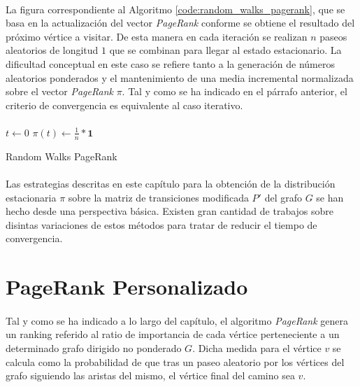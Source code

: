 \documentclass{subfiles}
\begin{document}
        \paragraph{}
        La figura correspondiente al Algoritmo \ref{code:random_walks_pagerank}, que se basa en la actualización del vector \emph{PageRank} conforme se obtiene el resultado del próximo vértice a visitar. De esta manera en cada iteración se realizan $n$ paseos aleatorios de longitud $1$ que se combinan para llegar al estado estacionario. La dificultad conceptual en este caso se refiere tanto a la generación de números aleatorios ponderados y el mantenimiento de una media incremental normalizada sobre el vector \emph{PageRank} $\pi$. Tal y como se ha indicado en el párrafo anterior, el criterio de convergencia es equivalente al caso iterativo.

        \paragraph{}
        \begin{algorithm}
          \SetAlgoLined
          $t \gets 0$\;
          $\pi(t) \gets \frac{1}{n}*\boldsymbol{1}$\;
          \caption{Random Walks PageRank}
          \label{code:random_walks_pagerank}
        \end{algorithm}

      \paragraph{}
      Las estrategias descritas en este capítulo para la obtención de la distribución estacionaria $\pi$ sobre la matriz de transiciones modificada $P'$ del grafo $G$ se han hecho desde una perspectiva básica. Existen gran cantidad de trabajos sobre disintas variaciones de estos métodos para tratar de reducir el tiempo de convergencia.


    \section{PageRank Personalizado}
    \label{sec:pagerank_algorithm_personalized}

      \paragraph{}
      Tal y como se ha indicado a lo largo del capítulo, el algoritmo \emph{PageRank} genera un ranking referido al ratio de importancia de cada vértice perteneciente a un determinado grafo dirigido no ponderado $G$. Dicha medida para el vértice $v$ se calcula como la probabilidad de que tras un paseo aleatorio por los vértices del grafo siguiendo las aristas del mismo, el vértice final del camino sea $v$.
\end{document}
